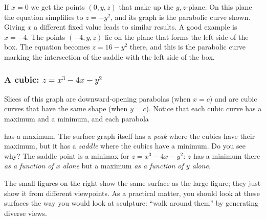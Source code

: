 {{{{	If $x = 0$ we get the points $(0, y, z)$ that make up the $y, z$-plane.  On this plane the equation simplifies to $z = -y^2$, and its graph is the parabolic curve shown.  
Giving $x$ a different fixed value leads to similar results.  A good example is $x = -4$.  The points $(-4, y, z)$ lie on the plane that forms the left side of the box.  The equation becomes $z = 16 - y^2$ there, and this is the parabolic curve marking the intersection of the saddle with the left side of the box.


\subsubsection{A cubic: $z = x^3 - 4x - y^2$}
\label{cubic}

	Slices of this graph are downward-opening parabolas (when $x = c$) and are cubic curves that have the same shape (when $y = c$).  Notice that each cubic curve has a maximum and a minimum, and each parabola 
\linebreak    

\vspace{110pt}

\noindent
has a maximum.  
The surface graph itself has a {\em peak\/} where the cubics have their maximum, but it has a {\em saddle\/} where the cubics have a minimum.  Do you see why?  The saddle point is a minimax for $z = x^3 -4x -y^2$: $z$ has a minimum there {\em as a function of $x$ alone} but a maximum {\em as a function of $y$ alone}.

\vspace{230pt}

	The small figures on the right show the same surface as the large figure; they just show it from different viewpoints.  
As a practical matter, you should look at these surfaces the way you would look at sculpture: ``walk around them'' by generating diverse views.   
	
}}}}
